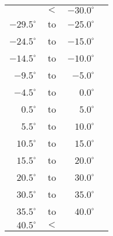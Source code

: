 \documentclass{article}
\begin{document}
\begin{preview}
    \begin{tabular}{rcrc}
    \toprule
                   & $<$ & $-30.0^\circ$      & \cellcolor[HTML]{A0A0A0} \\
    $-29.5^\circ$   & to & $-25.0^\circ$      & \cellcolor[HTML]{C0C0C0} \\
    $-24.5^\circ$   & to & $-15.0^\circ$      & \cellcolor[HTML]{DCDCDC} \\
    $-14.5^\circ$   & to & $-10.0^\circ$      & \cellcolor[HTML]{8AC8E6} \\
    $-9.5^\circ$    & to & $-5.0^\circ$       & \cellcolor[HTML]{00F0FF} \\
    $-4.5^\circ$    & to & $0.0^\circ$        & \cellcolor[HTML]{8AF091} \\
    $0.5^\circ$     & to & $5.0^\circ$        & \cellcolor[HTML]{FFFF00} \\
    $5.5^\circ$     & to & $10.0^\circ$       & \cellcolor[HTML]{FFA900} \\
    $10.5^\circ$    & to & $15.0^\circ$       & \cellcolor[HTML]{FF6D00} \\
    $15.5^\circ$    & to & $20.0^\circ$       & \cellcolor[HTML]{FF5000} \\
    $20.5^\circ$    & to & $30.0^\circ$       & \cellcolor[HTML]{FF0F00} \\
    $30.5^\circ$    & to & $35.0^\circ$       & \cellcolor[HTML]{D30000} \\
    $35.5^\circ$    & to & $40.0^\circ$       & \cellcolor[HTML]{C20000} \\
    $40.5^\circ$    & $<$ &                   & \cellcolor[HTML]{610000} \\ 
    \bottomrule
    \end{tabular}%
\end{preview}
\end{document}
